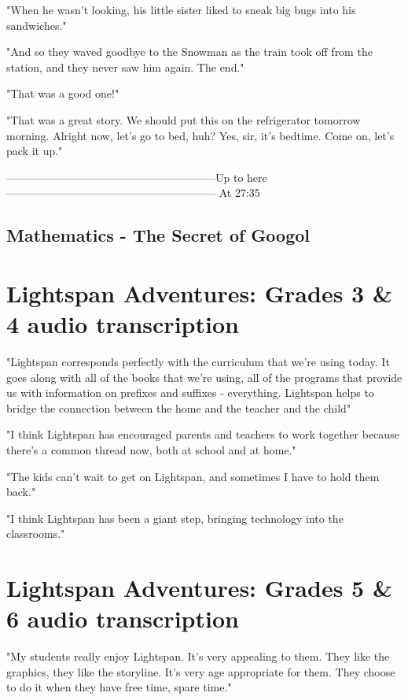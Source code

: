 "When he wasn't looking, his little sister liked to sneak big bugs into his sandwiches."

"And so they waved goodbye to the Snowman as the train took off from the station, and they never saw him again.
The end."

"That was a good one!"

"That was a great story.
We should put this on the refrigerator tomorrow morning.
Alright now, let's go to bed, huh?
Yes, sir, it's bedtime. Come on, let's pack it up."

---------------------------------------------------------Up to here---------------------------------------------------------
At 27:35

\subsection{Mathematics - The Secret of Googol}



\section{Lightspan Adventures: Grades 3 \& 4 audio transcription}

"Lightspan corresponds perfectly with the curriculum that we're using today.
It goes along with all of the books that we're using, all of the programs that provide us with information on prefixes and suffixes - everything.
Lightspan helps to bridge the connection between the home and the teacher and the child"

"I think Lightspan has encouraged parents and teachers to work together because there's a common thread now, both at school and at home."

"The kids can't wait to get on Lightspan, and sometimes I have to hold them back."

"I think Lightspan has been a giant step, bringing technology into the classrooms."

\section{Lightspan Adventures: Grades 5 \& 6 audio transcription}

"My students really enjoy Lightspan.
It's very appealing to them.
They like the graphics, they like the storyline.
It's very age appropriate for them.
They choose to do it when they have free time, spare time."

